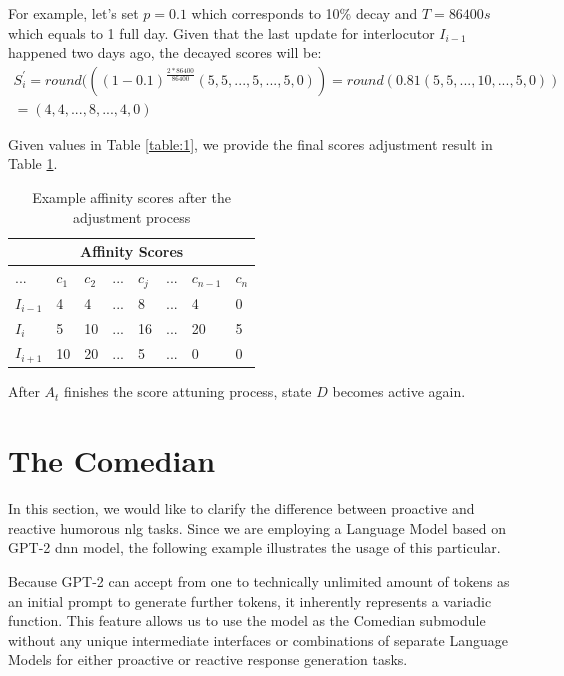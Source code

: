 For example, let's set \( p=0.1\) which corresponds to 10\% decay and \( T = 86400 s\) which equals to 1 full day. Given that the last update for interlocutor \( I_{i-1}\) happened two days ago, the decayed scores will be:
\begin{multline*}
S_i^{'} = round(((1-0.1)^{\frac{2*86400}{86400}}(5, 5,..., 5,..., 5, 0)) = round(0.81(5, 5,..., 10,..., 5, 0)) \\ = (4, 4,..., 8,..., 4, 0)
\end{multline*} \par
    
Given values in Table \ref{table:1}, we provide the final scores adjustment result in Table \ref{table:2}.
    
\begin{table}[htpb]
\centering
\begin{tabular}{ |l|l l l l l l l| }
    \hline
    \multicolumn{8}{|c|}{Affinity Scores} \\
    \hline
    ... & \( c_1\) & \( c_2\) & ... & \( c_j\) & ... & \( c_{n-1}\) & \( c_n\) \\
    \hline
    \( I_{i-1}\) & 4 & 4 & ... & 8 & ... & 4 & 0 \\
    \( I_{i}\) & 5 & 10 & ... & 16 & ... & 20 & 5 \\
    \( I_{i+1}\) & 10 & 20 & ... & 5 & ... & 0 & 0 \\
    \hline
    \end{tabular}
\caption{Example affinity scores after the adjustment process}
\label{table:2}
\end{table}

After \( A_t\) finishes the score attuning process, state \( D\) becomes active again.

\section{The Comedian}

In this section, we would like to clarify the difference between proactive and reactive humorous \acrlong{nlg} tasks. Since we are employing a Language Model based on GPT-2 \acrlong{dnn} {model}, the following example illustrates the usage of this particular.

Because GPT-2 can accept from one to technically unlimited amount of tokens as an initial prompt to generate further tokens, it inherently represents a variadic function. This feature allows us to use the model as the Comedian submodule without any unique intermediate interfaces or combinations of separate Language Models for either proactive or reactive response generation tasks.

